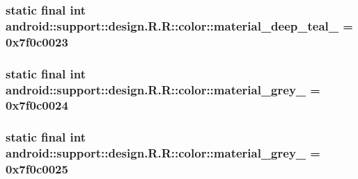 \hypertarget{classandroid_1_1support_1_1design_1_1_r_1_1color_818f72017be50d19a39614aab776abd4}{
\subsubsection[{material\_\-deep\_\-teal\_\-500}]{\setlength{\rightskip}{0pt plus 5cm}static final int android::support::design.R.R::color::material\_\-deep\_\-teal\_ = 0x7f0c0023}}
\label{classandroid_1_1support_1_1design_1_1_r_1_1color_818f72017be50d19a39614aab776abd4}


\hypertarget{classandroid_1_1support_1_1design_1_1_r_1_1color_00754f2d541cd6bff1288d48b3a472b5}{
\subsubsection[{material\_\-grey\_\-100}]{\setlength{\rightskip}{0pt plus 5cm}static final int android::support::design.R.R::color::material\_\-grey\_ = 0x7f0c0024}}
\label{classandroid_1_1support_1_1design_1_1_r_1_1color_00754f2d541cd6bff1288d48b3a472b5}


\hypertarget{classandroid_1_1support_1_1design_1_1_r_1_1color_505407ad3c17d2b15a9e33633c07fde6}{
\subsubsection[{material\_\-grey\_\-300}]{\setlength{\rightskip}{0pt plus 5cm}static final int android::support::design.R.R::color::material\_\-grey\_ = 0x7f0c0025}}
\label{classandroid_1_1support_1_1design_1_1_r_1_1color_505407ad3c17d2b15a9e33633c07fde6}


